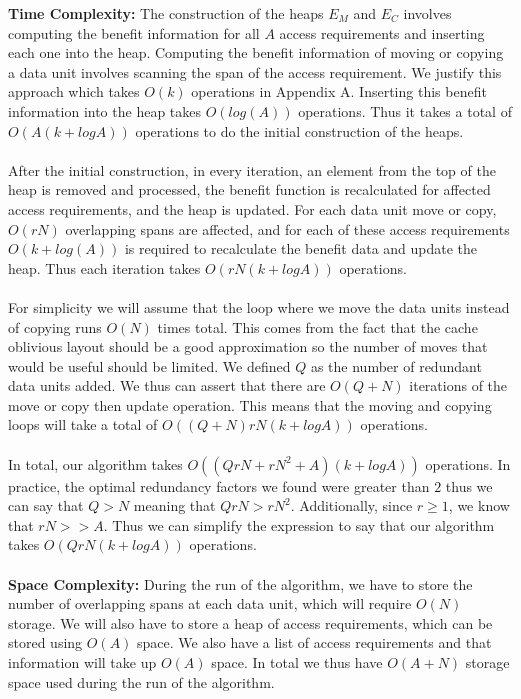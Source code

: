 {\bf Time Complexity:} The construction of the heaps $E_M$ and $E_C$ involves
computing the benefit information for all $A$ access requirements and inserting
each one into the heap. Computing the benefit information of moving or copying
a data unit involves scanning the span of the access requirement. We justify
this approach which takes $O(k)$ operations in Appendix A. Inserting this
benefit information into the heap takes $O(log (A))$ operations. Thus it takes
a total of $O(A (k + logA))$ operations to do the initial construction of the
heaps. \\
\\
After the initial construction, in every iteration, an element from the top of the heap is removed and processed, the benefit function is recalculated for affected access requirements, and the heap is updated. For each data unit move or copy, $O(rN)$ overlapping spans are affected, and for each of these access requirements $O(k+log(A))$ is required to recalculate the benefit data and update the heap. Thus each iteration takes $O(rN(k + logA))$ operations.\\
\\
For simplicity we will assume that the loop where we move the data units
instead of copying runs $O(N)$ times total. This comes from the fact that the
cache oblivious layout \cite{cacheobliviouslayout} should be a good
approximation so the number of moves that would be useful should be
limited. We defined $Q$ as the number of redundant data units added. We thus
can assert that there are $O(Q + N)$ iterations of the move or copy then update
operation. This means that the moving and copying loops will take a total of
$O((Q+N) rN (k + logA))$ operations. \\
\\
In total, our algorithm takes $O((QrN + rN^2 + A)(k + logA))$ operations. In practice, the optimal redundancy factors we found were greater than $2$ thus we can say that $Q > N$ meaning that $QrN > rN^2$. Additionally, since $r \geq 1$, we know that $rN > > A$. Thus we can simplify the expression to say that our algorithm takes $O(QrN(k + logA))$ operations. \\
\\
{\bf Space Complexity:} During the run of the algorithm, we have to store the number of overlapping spans at each data unit, which will require $O(N)$ storage. We will also have to store a heap of access requirements, which can be stored using $O(A)$ space. We also have a list of access requirements and that information will take up $O(A)$ space. In total we thus have $O(A + N)$ storage space used during the run of the algorithm. 
